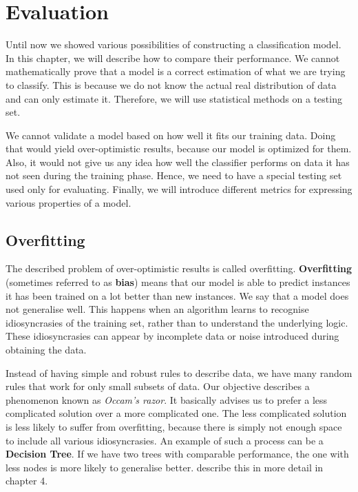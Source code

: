 \chapter{Evaluation} \label{chap:eval}

Until now we showed various possibilities of constructing a classification model.
In this chapter, we will describe how to compare their performance.
We cannot mathematically prove that a model is a correct estimation of what we are trying to classify.
This is because we do not know the actual real distribution of data and can only estimate it.
Therefore, we will use statistical methods on a testing set.

We cannot validate a model based on how well it fits our training data.
Doing that would yield over-optimistic results, because our model is optimized for them.
Also, it would not give us any idea how well the classifier performs on data it has not seen during the training phase.
Hence, we need to have a special testing set used only for evaluating.
Finally, we will introduce different metrics for expressing various properties of a model.

\section{Overfitting}

The described problem of over-optimistic results is called overfitting.
{\bf Overfitting} (sometimes referred to as {\bf bias}) means
that our model is able to predict instances it has been trained on a lot better than new instances. 
We say that a model does not generalise well.
This happens when an algorithm learns to recognise idiosyncrasies of the training set,
rather than to understand the underlying logic.
These idiosyncrasies can appear by incomplete data or noise introduced during obtaining the data.

Instead of having simple and robust rules to describe data,
we have many random rules that work for only small subsets of data.
Our objective describes a phenomenon known as {\it Occam's razor}. 
It basically advises us to prefer a less complicated solution over a more complicated one.
The less complicated solution is less likely to suffer from overfitting,
because there is simply not enough space to include all various idiosyncrasies.
An example of such a process can be a {\bf Decision Tree}.
If we have two trees with comparable performance,
the one with less nodes is more likely to generalise better.
\citet{TanBachKum08} describe this in more detail in chapter 4.

